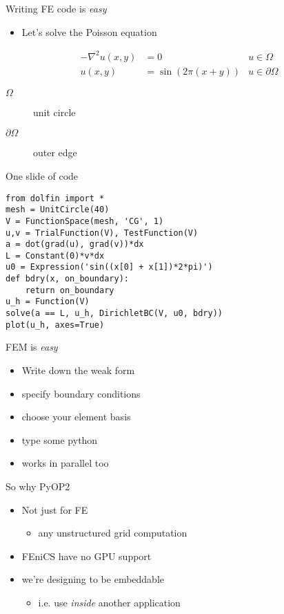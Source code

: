 \documentclass[bigger]{beamer}
\begin{document}
\begin{frame}[label={sec:orgheadline23}]{Writing FE code is \emph{easy}}
\begin{itemize}
\item Let's solve the Poisson equation
\end{itemize}

\begin{align*}
-\nabla^2 u(x, y) &= 0 \;\;\;\;& u \in \Omega\\
u(x, y) &= \sin(2\pi(x + y)) & u \in \partial\Omega
\end{align*}

\begin{description}
\item[{\(\Omega\)}] unit circle
\item[{\(\partial \Omega\)}] outer edge
\end{description}
\end{frame}

\begin{frame}[fragile,label={sec:orgheadline24}]{One slide of code}
 \begin{verbatim}
from dolfin import *
mesh = UnitCircle(40)
V = FunctionSpace(mesh, 'CG', 1)
u,v = TrialFunction(V), TestFunction(V)
a = dot(grad(u), grad(v))*dx
L = Constant(0)*v*dx
u0 = Expression('sin((x[0] + x[1])*2*pi)')
def bdry(x, on_boundary):
    return on_boundary
u_h = Function(V)
solve(a == L, u_h, DirichletBC(V, u0, bdry))
plot(u_h, axes=True)
\end{verbatim}
\end{frame}

\begin{frame}[label={sec:orgheadline25}]{FEM is \emph{easy}}
\begin{itemize}
\item Write down the weak form
\item specify boundary conditions
\item choose your element basis
\item type some python
\item works in parallel too
\end{itemize}
\end{frame}

\begin{frame}[label={sec:orgheadline26}]{So why PyOP2}
\begin{itemize}
\item Not just for FE
\begin{itemize}
\item any unstructured grid computation
\end{itemize}
\item FEniCS have no GPU support
\item we're designing to be embeddable
\begin{itemize}
\item i.e. use \emph{inside} another application
\end{itemize}
\end{itemize}
\end{frame}
\end{document}
